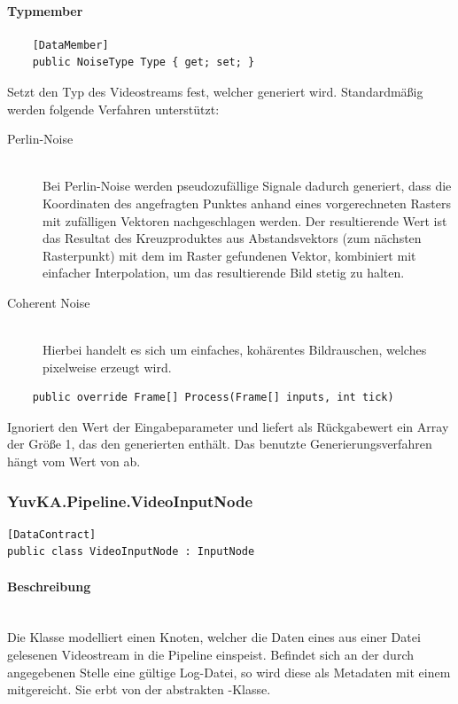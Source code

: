 \paragraph{Typmember}
\begin{itemize}

	\begin{verbatim}
	[DataMember]
	public NoiseType Type { get; set; }
	\end{verbatim}
	Setzt den Typ des Videostreams fest, welcher generiert wird. Standardmäßig werden folgende Verfahren unterstützt:
	\begin{description}
		\item[Perlin-Noise]~\\
		Bei Perlin-Noise werden pseudozufällige Signale dadurch generiert, dass die Koordinaten des angefragten Punktes anhand eines vorgerechneten Rasters mit zufälligen Vektoren nachgeschlagen werden. Der resultierende Wert ist das Resultat des Kreuzproduktes aus Abstandsvektors (zum nächsten Rasterpunkt) mit dem im Raster gefundenen Vektor, kombiniert mit einfacher Interpolation, um das resultierende Bild stetig zu halten.
		\item[Coherent Noise]~\\
		Hierbei handelt es sich um einfaches, kohärentes Bildrauschen, welches pixelweise erzeugt wird.
	\end{description}

	\begin{verbatim}
	public override Frame[] Process(Frame[] inputs, int tick)
	\end{verbatim}
	Ignoriert den Wert der Eingabeparameter und liefert als Rückgabewert ein Array der Größe 1, das den generierten  enthält. Das benutzte Generierungsverfahren hängt vom Wert von  ab.


\end{itemize}

\subsubsection{YuvKA.Pipeline.VideoInputNode}

\begin{verbatim}
[DataContract]
public class VideoInputNode : InputNode
\end{verbatim}

\paragraph{Beschreibung}~\\
Die Klasse  modelliert einen Knoten, welcher die Daten eines aus einer Datei gelesenen Videostream in die Pipeline einspeist. Befindet sich an der durch  angegebenen Stelle eine gültige Log-Datei, so wird diese als Metadaten mit einem  mitgereicht. Sie erbt von der abstrakten -Klasse.


